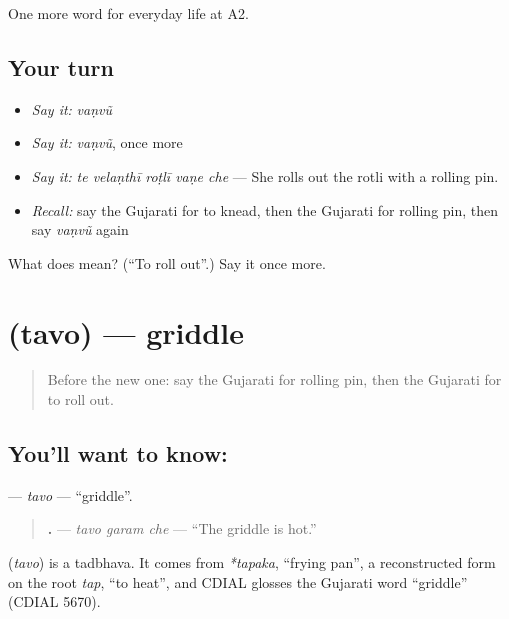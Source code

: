 \begin{grammarlens}[title={What you've built}]
One more word for everyday life at A2.
\end{grammarlens}

\subsection*{Your turn}
\begin{itemize}
\raggedright
  \item \emph{Say it:} \emph{vaṇvũ}
  \item \emph{Say it:} \emph{vaṇvũ}, once more
  \item \emph{Say it:} \emph{te velaṇthī roṭlī vaṇe che} — She rolls out the rotli with a rolling pin.
  \item \emph{Recall:} say the Gujarati for to knead, then the Gujarati for rolling pin, then say \emph{vaṇvũ} again
\end{itemize}

\begin{tcolorbox}[breakable,colback=teal!4,colframe=teal!35!black,title={Before you move on}]
What does  mean? (\textquotedblleft{}To roll out\textquotedblright{}.) Say it once more.
\end{tcolorbox}
\section[\texorpdfstring{\gu{તવો} (tavo)}{તવો (tavo)}]{ (tavo) — griddle}

\label{lesson:GU-C168-tavo}



\begin{quote}
Before the new one: say the Gujarati for rolling pin, then the Gujarati for to roll out.
\end{quote}

\subsection*{You'll want to know: }
\textbf{} — \emph{tavo} — \textquotedblleft{}griddle\textquotedblright{}.

\begin{quote}
\textbf{  .} — \emph{tavo garam che} — \textquotedblleft{}The griddle is hot.\textquotedblright{}
\end{quote}

\begin{cousinweb}
\textbf{} (\emph{tavo}) is a tadbhava. It comes from \emph{*tapaka}, \textquotedblleft{}frying pan\textquotedblright{}, a reconstructed form on the root \emph{tap}, \textquotedblleft{}to heat\textquotedblright{}, and CDIAL glosses the Gujarati word \textquotedblleft{}griddle\textquotedblright{} (CDIAL 5670).
\end{cousinweb}

